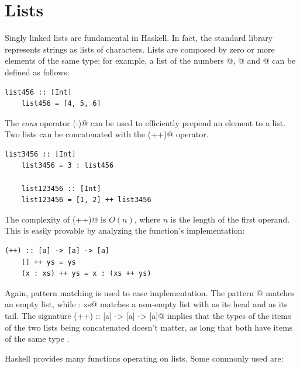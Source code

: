 \documentclass[UdineBachThesis,american,11pt]{PhdThesis}
\begin{document}
  \section{Lists}

  Singly linked lists are fundamental in Haskell. In fact, the standard library
  represents strings as lists of characters. Lists are composed by zero or more
  elements of the same type; for example, a list of the numbers @,
  @ and @ can be defined as follows:

  \begin{lstlisting}[gobble=4,basicstyle=\ttfamily\small]
    list456 :: [Int]
    list456 = [4, 5, 6]
  \end{lstlisting}

  The \emph{cons} operator \lstinline@(:)@ can be used to efficiently prepend an
  element to a list. Two lists can be concatenated with the \lstinline@(++)@
  operator.

  \begin{lstlisting}[gobble=4,basicstyle=\ttfamily\small]
    list3456 :: [Int]
    list3456 = 3 : list456

    list123456 :: [Int]
    list123456 = [1, 2] ++ list3456
  \end{lstlisting}

  The complexity of \lstinline@(++)@ is
  $O\mathopen{}\left(n\right)\mathclose{}$, where $n$ is the length of the first
  operand. This is easily provable by analyzing the function's implementation:

  \begin{lstlisting}[gobble=4,basicstyle=\ttfamily\small]
    (++) :: [a] -> [a] -> [a]
    [] ++ ys = ys
    (x : xs) ++ ys = x : (xs ++ ys)
  \end{lstlisting}

  Again, pattern matching is used to ease implementation. The pattern
  \lstinline@[]@ matches an empty list, while \lstinline@x : xs@ matches a
  non-empty list with \lstinline@x@ as its head and \lstinline@xs@ as its tail.
  The signature \lstinline@(++) :: [a] -> [a] -> [a]@ implies that the types of
  the items of the two lists being concatenated doesn't matter, as long that
  both have items of the same type \lstinline@a@.

  Haskell provides many functions operating on lists. Some commonly used are:
\end{document}
